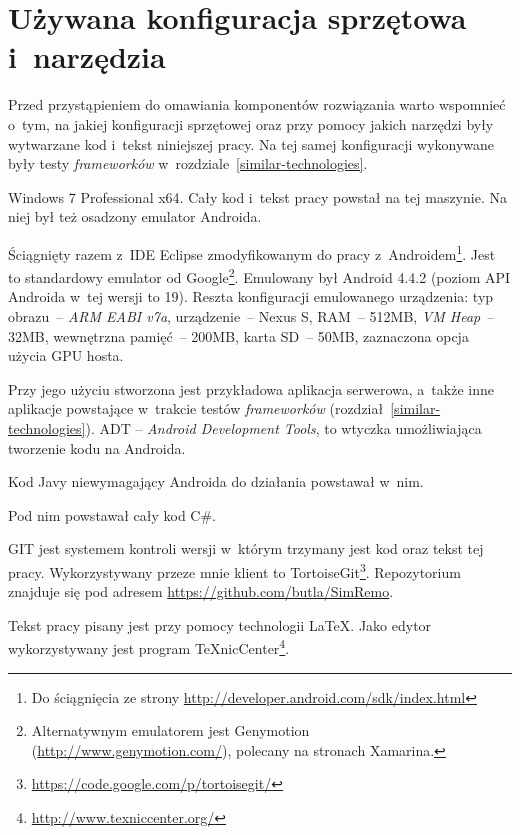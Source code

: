 \section{Używana konfiguracja sprzętowa i~narzędzia}
\label{system-configuration}
Przed przystąpieniem do omawiania komponentów rozwiązania warto wspomnieć o~tym, na jakiej konfiguracji sprzętowej oraz przy pomocy jakich narzędzi były wytwarzane kod i~tekst niniejszej pracy. Na tej samej konfiguracji wykonywane były testy \emph{frameworków} w~rozdziale~\ref{similar-technologies}.

\begin{description}
Windows 7 Professional x64. Cały kod i~tekst pracy powstał na tej maszynie. Na niej był też osadzony emulator Androida.

Ściągnięty razem z~IDE Eclipse zmodyfikowanym do pracy z~Androidem\footnote{Do ściągnięcia ze strony \url{http://developer.android.com/sdk/index.html}}.
Jest to standardowy emulator od Google\footnote{Alternatywnym emulatorem jest Genymotion (\url{http://www.genymotion.com/}), polecany na stronach Xamarina.}.
Emulowany był Android 4.4.2 (poziom API Androida w~tej wersji to 19). Reszta konfiguracji emulowanego urządzenia: typ obrazu~-- \emph{ARM EABI v7a}, urządzenie~-- Nexus S, RAM~-- 512MB, \emph{VM Heap}~-- 32MB, wewnętrzna pamięć~-- 200MB, karta SD~-- 50MB, zaznaczona opcja użycia GPU hosta.

Przy jego użyciu stworzona jest przykładowa aplikacja serwerowa, a~także inne aplikacje powstające w~trakcie testów \emph{frameworków} (rozdział~\ref{similar-technologies}). ADT -- \emph{Android Development Tools}, to wtyczka umożliwiająca tworzenie kodu na Androida.

Kod Javy niewymagający Androida do działania powstawał w~nim.

Pod nim powstawał cały kod C\#.

GIT jest systemem kontroli wersji w~którym trzymany jest kod oraz tekst tej pracy. Wykorzystywany przeze mnie klient to TortoiseGit\footnote{\url{https://code.google.com/p/tortoisegit/}}. Repozytorium znajduje się pod adresem \url{https://github.com/butla/SimRemo}.

\itemtitle{\LaTeX}
Tekst pracy pisany jest przy pomocy technologii \LaTeX. Jako edytor wykorzystywany jest program TeXnicCenter\footnote{\url{http://www.texniccenter.org/}}.
\end{description}

